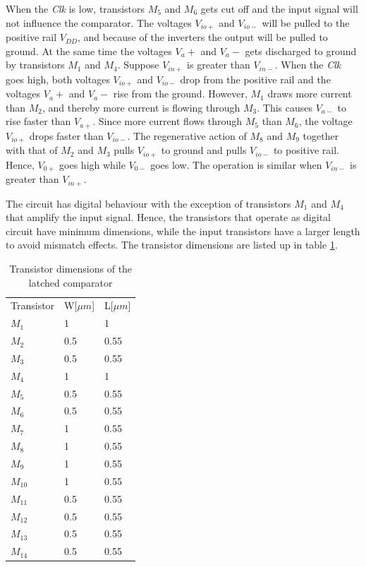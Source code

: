 When the \textit{Clk} is low, transistors $M_5$ and $M_6$ gets cut off and the input signal will not influence the comparator. The voltages $V_{io+}$ and $V_{io-}$ will be pulled to the positive rail $V_{DD}$, and because of the inverters the output will be pulled to ground. At the same time the voltages $V_a+$ and $V_a-$ gets discharged to ground by transistors $M_1$ and $M_4$. Suppose $V_{in+}$ is greater than $V_{in-}$. When the \textit{Clk} goes high, both voltages $V_{io+}$ and $V_{io-}$ drop from the positive rail and the voltages $V_a+$ and $V_a-$ rise from the ground. However, $M_1$ draws more current than $M_2$, and thereby more current is flowing through $M_3$. This causes $V_{a-}$ to rise faster than $V_{a+}$. Since more current flows through $M_5$ than $M_6$, the voltage $V_{io+}$ drops faster than $V_{io-}$. The regenerative action of $M_8$ and $M_9$ together with that of $M_2$ and $M_3$ pulls $V_{io+}$ to ground and pulls $V_{io-}$ to positive rail. Hence, $V_{0+}$ goes high while $V_{0-}$ goes low. The operation is similar when $V_{in-}$ is greater than $V_{in+}$.

The circuit has digital behaviour with the exception of transistors $M_1$ and $M_4$ that amplify the input signal. Hence, the transistors that operate as digital circuit have minimum dimensions, while the input transistors have a larger length to avoid mismatch effects. The transistor dimensions are listed up in table \ref{final_comparator}.

\begin{table}[]
\centering
\caption{Transistor dimensions of the latched comparator}
\label{final_comparator}
\begin{tabular}{l|l|l}
\hline
\multirow{1}{*}{Transistor} & \multicolumn{1}{c|}{W[$\mu m$]} & \multicolumn{1}{c}{L[$\mu m$]} \\\cline{1-3}
                       
            $M_1$       & 1 & 1\\
            $M_2$      & 0.5 & 0.55\\
            $M_3$      & 0.5 & 0.55\\
            $M_4$      & 1 & 1\\
            $M_5$      & 0.5 & 0.55\\
            $M_6$      & 0.5 & 0.55\\
            $M_7$      & 1 & 0.55\\
            $M_8$      & 1 & 0.55\\
            $M_9$      & 1 & 0.55\\
            $M_{10}$      & 1 & 0.55\\
            $M_{11}$      & 0.5 & 0.55\\
            $M_{12}$      & 0.5 & 0.55\\
            $M_{13}$      & 0.5 & 0.55\\
            $M_{14}$      & 0.5 & 0.55\\
            
\hline            
\end{tabular}
\end{table}

